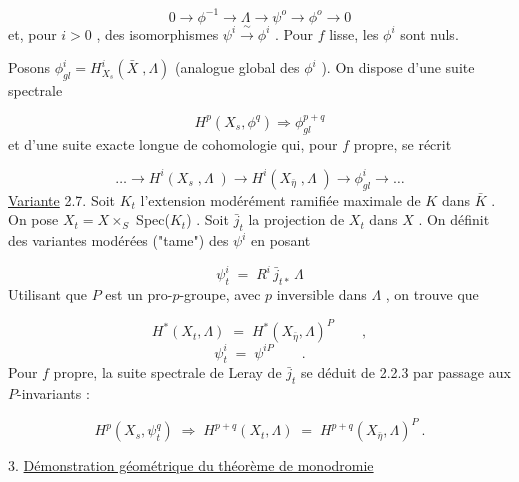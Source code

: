 \begin{equation*}
0 \longrightarrow \phi^{-1} \longrightarrow \Lambda \longrightarrow \psi^{o} \longrightarrow \phi^{o} \longrightarrow 0
\end{equation*}
et, pour  $i > 0$ , des isomorphismes  $\psi^i \xrightarrow{\ \sim\ } \phi^i$ . Pour  $f$  lisse, les  $\phi^i$  sont nuls.

Posons  $\phi^i_{gl} = H^i_{X_s}(\bar{X}\;,\Lambda)$  (analogue global des  $\phi^i$ ). On dispose d'une suite spectrale

\begin{equation*}\tag{2.6.1}
H^p(X_s,\phi^q) \Longrightarrow \phi^{p+q}_{gl}
\end{equation*}
et d'une suite exacte longue de cohomologie qui, pour  $f$  propre, se récrit

\begin{equation*}\tag{2.6.2}
\dots \longrightarrow H^i(X_s\;,\Lambda\;) \longrightarrow H^i(X_{\bar{\eta}}\;,\Lambda\;) \longrightarrow \phi^i_{gl} \longrightarrow \dots
\end{equation*}
\underline{Variante} 2.7.  Soit  $K_t$  l'extension modérément ramifiée maximale de  $K$  dans  $\bar{K}$ . On pose  $X_t = X \times_S$ Spec($K_t$) . Soit  $\bar{j}_t$  la projection de  $X_t$  dans  $X$ . On définit des variantes modérées  ("tame")  des  $\psi^i$  en posant



\begin{equation*}
\psi^{i}_{t} \;=\; R^{i}\,\bar{j}_{t*}\,\Lambda
\end{equation*}
Utilisant que  $P$  est un pro-$p$-groupe, avec  $p$  inversible dans  $\Lambda$ , on trouve que

\begin{equation}\tag{2.7.1}
H^{*}(X_{t},\Lambda) \;=\; H^{*}(X_{\bar{\eta}},\Lambda)^{P} \qquad ,
\end{equation}
\begin{equation}\tag{2.7.2}
\psi^{i}_{t} \;=\; \psi^{iP} \qquad .
\end{equation}
Pour  $f$  propre, la suite spectrale de Leray de  $\bar{j}_{t}$  se déduit de 2.2.3 par passage aux  $P$-invariants :

\begin{equation}\tag{2.7.3}
H^{p}(X_{s},\psi^{q}_{t}) \;\Longrightarrow\; H^{p+q}(X_{t},\Lambda) \;=\; H^{p+q}(X_{\bar{\eta}},\Lambda)^{P}\ .
\end{equation}

3. \underline{Démonstration géométrique du théorème de monodromie}

